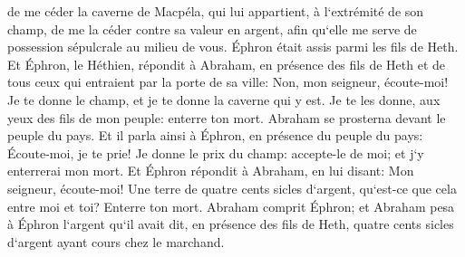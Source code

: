 \verse de me céder la caverne de Macpéla, qui lui appartient, à l`extrémité de son champ, de me la céder contre sa valeur en argent, afin qu`elle me serve de possession sépulcrale au milieu de vous. 
\verse Éphron était assis parmi les fils de Heth. Et Éphron, le Héthien, répondit à Abraham, en présence des fils de Heth et de tous ceux qui entraient par la porte de sa ville: 
\verse Non, mon seigneur, écoute-moi! Je te donne le champ, et je te donne la caverne qui y est. Je te les donne, aux yeux des fils de mon peuple: enterre ton mort. 
\verse Abraham se prosterna devant le peuple du pays. 
\verse Et il parla ainsi à Éphron, en présence du peuple du pays: Écoute-moi, je te prie! Je donne le prix du champ: accepte-le de moi; et j`y enterrerai mon mort. 
\verse Et Éphron répondit à Abraham, en lui disant: 
\verse Mon seigneur, écoute-moi! Une terre de quatre cents sicles d`argent, qu`est-ce que cela entre moi et toi? Enterre ton mort. 
\verse Abraham comprit Éphron; et Abraham pesa à Éphron l`argent qu`il avait dit, en présence des fils de Heth, quatre cents sicles d`argent ayant cours chez le marchand. 
